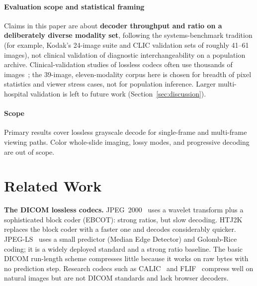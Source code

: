 \documentclass[journal]{IEEEtran}
\begin{document}
\paragraph{Evaluation scope and statistical framing}
Claims in this paper are about \textbf{decoder throughput and ratio on a
deliberately diverse modality set}, following the systems-benchmark tradition
(for example, Kodak's 24-image suite and CLIC validation sets of roughly 41--61
images), not clinical validation of diagnostic interchangeability on a
population archive. Clinical-validation studies of lossless codecs often use
thousands of images~\cite{clunie2000}; the 39-image, eleven-modality corpus here
is chosen for breadth of pixel statistics and viewer stress cases, not for
population inference. Larger multi-hospital validation is left to future work
(Section~\ref{sec:discussion}).

\paragraph{Scope} Primary results cover lossless grayscale decode for
single-frame and multi-frame viewing paths. Color whole-slide imaging, lossy
modes, and progressive decoding are out of scope.

\section{Related Work}
\label{sec:related}

\textbf{The DICOM lossless codecs.} JPEG~2000~\cite{taubman2002} uses a wavelet
transform plus a sophisticated block coder (EBCOT): strong ratios, but slow
decoding. HTJ2K~\cite{htj2k2019,taubman2022} replaces the block coder with a
faster one and decodes considerably quicker. JPEG-LS~\cite{loco1} uses a small
predictor (Median Edge Detector) and Golomb-Rice coding; it is a widely
deployed standard and a strong ratio baseline. The basic DICOM run-length
scheme compresses little because it works on raw bytes with no prediction step.
Research codecs such as CALIC~\cite{wu1997} and FLIF~\cite{sneyers2016}
compress well on natural images but are not DICOM standards and lack browser
decoders.
\end{document}
